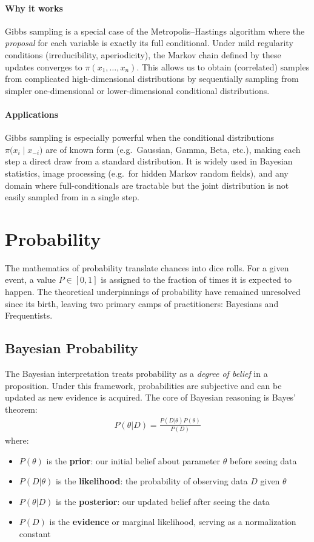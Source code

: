 \paragraph{Why it works}
Gibbs sampling is a special case of the Metropolis--Hastings algorithm where the \emph{proposal} for each variable is exactly its full conditional. Under mild regularity conditions (irreducibility, aperiodicity), the Markov chain defined by these updates converges to \(\pi(x_1, \dots, x_n)\). This allows us to obtain (correlated) samples from complicated high-dimensional distributions by sequentially sampling from simpler one-dimensional or lower-dimensional conditional distributions.

\paragraph{Applications}
Gibbs sampling is especially powerful when the conditional distributions \(\pi\bigl(x_i \mid x_{-i}\bigr)\) are of known form (e.g.\ Gaussian, Gamma, Beta, etc.), making each step a direct draw from a standard distribution. It is widely used in Bayesian statistics, image processing (e.g.\ for hidden Markov random fields), and any domain where full-conditionals are tractable but the joint distribution is not easily sampled from in a single step.

\section{Probability}
The mathematics of probability translate chances into dice rolls. For a given event, a value $P\in[0,1]$ is assigned to the fraction of times it is expected to happen. The theoretical underpinnings of probability have remained unresolved since its birth, leaving two primary camps of practitioners: Bayesians and Frequentists.

\subsection{Bayesian Probability}
The Bayesian interpretation treats probability as a \emph{degree of belief} in a proposition. Under this framework, probabilities are subjective and can be updated as new evidence is acquired. The core of Bayesian reasoning is Bayes' theorem:
\begin{align}
	P(\theta | D) = \frac{P(D | \theta) P(\theta)}{P(D)}
\end{align}
where:
\begin{itemize}
	\item $P(\theta)$ is the \textbf{prior}: our initial belief about parameter $\theta$ before seeing data
	\item $P(D | \theta)$ is the \textbf{likelihood}: the probability of observing data $D$ given $\theta$
	\item $P(\theta | D)$ is the \textbf{posterior}: our updated belief after seeing the data
	\item $P(D)$ is the \textbf{evidence} or marginal likelihood, serving as a normalization constant
\end{itemize}

